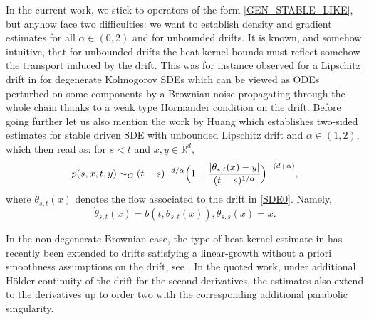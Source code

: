 \documentclass[11pt]{article}
\numberwithin{equation}{section}\providecommand{\asymp}{\mathrel{\sim}}
\theoremstyle{plain}
\theoremstyle{definition}
\newcommand\mR{\mathbb{R}}
\newcommand\1{{\mathbf{1}}}
\begin{document}
In the current work, {we stick to operators of the form \eqref{GEN_STABLE_LIKE}, but anyhow face two difficulties:} we want to establish {density and} gradient estimates for all $\alpha\in (0,2) $ and for unbounded drifts. It is known, and somehow intuitive, that for unbounded drifts the heat kernel bounds must reflect somehow the transport induced by the drift. This was for instance observed for a Lipschitz drift in \cite{dela:meno:10} for degenerate Kolmogorov SDEs which can be viewed as ODEs perturbed on some components by a Brownian noise propagating through the whole chain thanks to a weak type Hörmander condition on the drift.
Before going further let us also mention the work by Huang \cite{huan:15}
which establishes two-sided estimates for stable driven SDE with unbounded Lipschitz drift and $\alpha\in(1,2)$,
which then read as: for $s<t$ and $x,y\in\mR^d$,
\begin{equation}
\label{SECOND_TW}
p(s,x,t,y)\asymp_C (t-s)^{-d/\alpha} \Bigl(1+\frac{|\theta_{s,t}(x)-y|}{(t-s)^{1/\alpha}}\Bigr)^{-(d+\alpha)},
\end{equation}
where $\theta_{s,t}(x) $ denotes the flow associated to the drift in \eqref{SDE0}. Namely,
\[
\dot \theta_{s,t}(x)=b(t,\theta_{s,t}(x)), \theta_{s,s}(x)=x.
\]

In the non-degenerate Brownian case, the type of heat kernel estimate in \cite{dela:meno:10} has recently been extended to drifts satisfying a linear-growth without a priori smoothness assumptions on the drift, see \cite{meno:pesc:zhan:20}. In the quoted work, under additional Hölder continuity of the drift for the second derivatives, the estimates also extend to the derivatives up to order two with the corresponding additional parabolic singularity.
\end{document}
